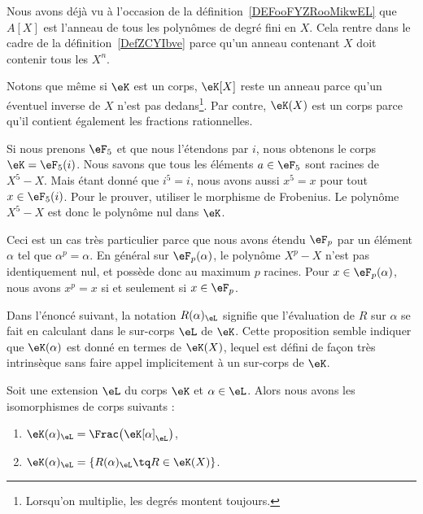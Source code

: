 \begin{example}
	Nous avons déjà vu à l'occasion de la définition~\ref{DEFooFYZRooMikwEL} que \( A[X]\) est l'anneau de tous les polynômes de degré fini en \( X\). Cela rentre dans le cadre de la définition~\ref{DefZCYIbve} parce qu'un anneau contenant \( X\) doit contenir tous les \( X^n\).

	Notons que même si \( \eK\) est un corps, \( \eK[X]\) reste un anneau parce qu'un éventuel inverse de \( X\) n'est pas dedans\footnote{Lorsqu'on multiplie, les degrés montent toujours.}. Par contre, \( \eK(X)\) est un corps parce qu'il contient également les fractions rationnelles.
\end{example}

\begin{example} \label{ExLQhLhJ}
	Si nous prenons \( \eF_5\) et que nous l'étendons par \( i\), nous obtenons le corps \( \eK=\eF_5(i)\). Nous savons que tous les éléments \( a\in \eF_5\) sont racines de \( X^5-X\). Mais étant donné que \( i^5=i\), nous avons aussi \( x^5=x\) pour tout \( x\in \eF_5(i)\). Pour le prouver, utiliser le morphisme de Frobenius. Le polynôme \( X^5-X\) est donc le polynôme nul dans \( \eK\).

	Ceci est un cas très particulier parce que nous avons étendu \( \eF_p\) par un élément \( \alpha\) tel que \( \alpha^p=\alpha\). En général sur \( \eF_p(\alpha)\), le polynôme \( X^p-X\) n'est pas identiquement nul, et possède donc au maximum \( p\) racines. Pour \( x\in \eF_p(\alpha)\), nous avons \( x^p=x\) si et seulement si \( x\in \eF_p\).
\end{example}

Dans l'énoncé suivant, la notation \( R(\alpha)_{\eL}\) signifie que l'évaluation de \( R\) sur \( \alpha\) se fait en calculant dans le sur-corps \( \eL\) de \( \eK\).  Cette proposition semble indiquer que \( \eK(\alpha)\) est donné en termes de \( \eK(X)\), lequel est défini de façon très intrinsèque sans faire appel implicitement à un sur-corps de \( \eK\).

\begin{proposition}     \label{PROPooYSFNooFGbbCi}
	Soit une extension \( \eL\) du corps \( \eK\) et \( \alpha\in \eL\). Alors nous avons les isomorphismes de corps suivants :
	\begin{enumerate}
		\item
		      \( \eK(\alpha)_{\eL}=\Frac\big( \eK[\alpha]_{\eL} \big)\),
		\item       \label{ITEMooATPTooVXKdlK}
		      \( \eK(\alpha)_{\eL}=\{ R(\alpha)_{\eL}\tq R\in \eK(X) \}\).
	\end{enumerate}
\end{proposition}

